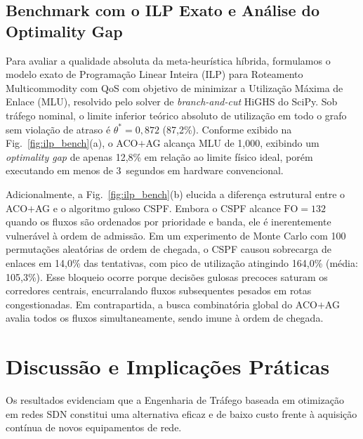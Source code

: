 \documentclass[journal]{IEEEtran}
\newcommand{\FO}{\mathrm{FO}}
\begin{document}
\subsection{Benchmark com o ILP Exato e An\'{a}lise do Optimality Gap}
Para avaliar a qualidade absoluta da meta-heur\'{i}stica h\'{i}brida, formulamos o modelo exato de Programa\c{c}\~{a}o Linear Inteira (ILP) para Roteamento Multicommodity com QoS com objetivo de minimizar a Utiliza\c{c}\~{a}o M\'{a}xima de Enlace (MLU), resolvido pelo solver de \emph{branch-and-cut} HiGHS do SciPy. Sob tr\'{a}fego nominal, o limite inferior te\'{o}rico absoluto de utiliza\c{c}\~{a}o em todo o grafo sem viola\c{c}\~{a}o de atraso \'{e} $\theta^* = 0,872$ (87,2\%). Conforme exibido na Fig.~\ref{fig:ilp_bench}(a), o ACO$+$AG alcan\c{c}a MLU de 1,000, exibindo um \emph{optimality gap} de apenas 12,8\% em rela\c{c}\~{a}o ao limite f\'{i}sico ideal, por\'{e}m executando em menos de 3~segundos em hardware convencional.

Adicionalmente, a Fig.~\ref{fig:ilp_bench}(b) elucida a diferen\c{c}a estrutural entre o ACO$+$AG e o algoritmo guloso CSPF. Embora o CSPF alcance $\FO = 132$ quando os fluxos s\~{a}o ordenados por prioridade e banda, ele \'{e} inerentemente vulner\'{a}vel \`{a} ordem de admiss\~{a}o. Em um experimento de Monte Carlo com 100 permuta\c{c}\~{o}es aleat\'{o}rias de ordem de chegada, o CSPF causou sobrecarga de enlaces em 14,0\% das tentativas, com pico de utiliza\c{c}\~{a}o atingindo 164,0\% (m\'{e}dia: 105,3\%). Esse bloqueio ocorre porque decis\~{o}es gulosas precoces saturam os corredores centrais, encurralando fluxos subsequentes pesados em rotas congestionadas. Em contrapartida, a busca combinat\'{o}ria global do ACO$+$AG avalia todos os fluxos simultaneamente, sendo imune \`{a} ordem de chegada.

\section{Discuss\~{a}o e Implica\c{c}\~{o}es Pr\'{a}ticas}
\label{sec:discussao}
Os resultados evidenciam que a Engenharia de Tr\'{a}fego baseada em otimiza\c{c}\~{a}o em redes SDN constitui uma alternativa eficaz e de baixo custo frente \`{a} aquisi\c{c}\~{a}o cont\'{i}nua de novos equipamentos de rede.
\end{document}
